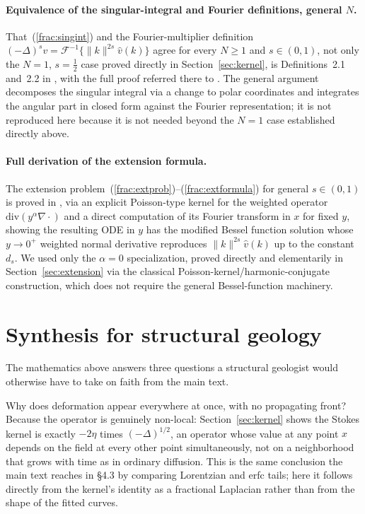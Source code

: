 \documentclass{article}
\begin{document}
\paragraph*{Equivalence of the singular-integral and Fourier definitions,
general $N$.} That~(\ref{frac:singint}) and the Fourier-multiplier
definition $(-\Delta)^sv = \mathcal{F}^{-1}\{\|k\|^{2s}\hat v(k)\}$ agree for
every $N\ge1$ and $s\in(0,1)$, not only the $N=1$, $s=\tfrac12$ case proved
directly in Section~\ref{sec:kernel}, is Definitions~2.1 and~2.2 in
\citet{daoud2022fractional}, with the full proof referred there to
\citet[Section~3]{dinezza2012hitchhikers}. The general argument decomposes
the singular integral via a change to polar coordinates and integrates the
angular part in closed form against the Fourier representation; it is not
reproduced here because it is not needed beyond the $N=1$ case established
directly above.

\paragraph*{Full derivation of the extension formula.} The extension
problem~(\ref{frac:extprob})--(\ref{frac:extformula}) for general
$s\in(0,1)$ is proved in \citet{caffarelli2007extension}, via an explicit
Poisson-type kernel for the weighted operator $\mathrm{div}(y^\alpha\nabla\cdot)$
and a direct computation of its Fourier transform in $x$ for fixed $y$,
showing the resulting ODE in $y$ has the modified Bessel function solution
whose $y\to0^+$ weighted normal derivative reproduces $\|k\|^{2s}\hat v(k)$
up to the constant $d_s$. We used only the $\alpha=0$ specialization, proved
directly and elementarily in Section~\ref{sec:extension} via the classical
Poisson-kernel/harmonic-conjugate construction, which does not require the
general Bessel-function machinery.

\section{Synthesis for structural geology}
\label{sec:synthesis}

The mathematics above answers three questions a structural geologist would
otherwise have to take on faith from the main text.

Why does deformation appear everywhere at once, with no propagating front?
Because the operator is genuinely non-local: Section~\ref{sec:kernel} shows
the Stokes kernel is exactly $-2\eta$ times $(-\Delta)^{1/2}$, an operator
whose value at any point $x$ depends on the field at every other point
simultaneously, not on a neighborhood that grows with time as in ordinary
diffusion. This is the same conclusion the main text reaches in §4.3 by
comparing Lorentzian and erfc tails; here it follows directly from the
kernel's identity as a fractional Laplacian rather than from the shape of
the fitted curves.
\end{document}
